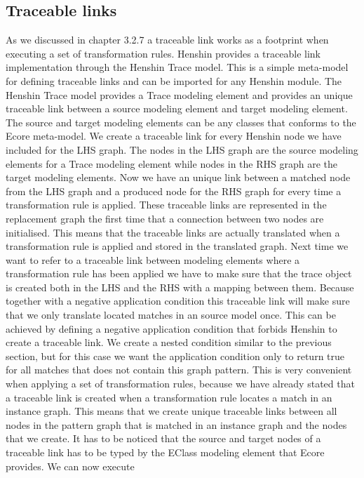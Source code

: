 \subsection{Traceable links}
\label{Trace}

As we discussed in chapter 3.2.7 a traceable link works as a footprint when
executing a set of transformation rules. Henshin provides a traceable link
implementation through the Henshin Trace model. This is a simple meta-model for
defining traceable links and can be imported for any Henshin module. The Henshin
Trace model provides a Trace modeling element and provides an unique traceable
link between a source modeling element and target modeling element. The source
and target modeling elements can be any classes that conforms to the Ecore
meta-model. We create a traceable link for every Henshin node we have included
for the LHS graph. The nodes in the LHS graph are the source modeling elements
for a Trace modeling element while nodes in the RHS graph are the target
modeling elements. Now we have an unique link between a matched node from the
LHS graph and a produced node for the RHS graph for every time a transformation
rule is applied. These traceable links are represented in the replacement graph
the first time that a connection between two nodes are initialised. This means
that the traceable links are actually translated when a transformation rule is
applied and stored in the translated graph. Next time we want to refer to
a traceable link between modeling elements where a transformation rule has been
applied we have to make sure that the trace object is created both in the LHS
and the RHS with a mapping between them. Because together with a negative
application condition this traceable link will make sure that we only translate
located matches in an source model once. This can be achieved by defining a
negative application condition that forbids Henshin to create a traceable link.
We create a nested condition similar to the previous section, but for this case
we want the application condition only to return true for all matches that does
not contain this graph pattern. This is very convenient when applying a set of
transformation rules, because we have already stated that a traceable link is
created when a transformation rule locates a match in an instance graph. This
means that we create unique traceable links between all nodes in the pattern
graph that is matched in an instance graph and the nodes that we create. It has
to be noticed that the source and target nodes of a traceable link has to be
typed by the EClass modeling element that Ecore provides. We can now execute
